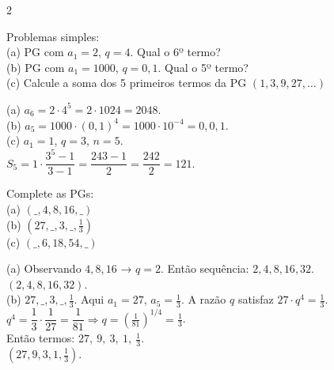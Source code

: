 \documentclass[11pt]{article}
\begin{document}
\begin{multicols}{2}
\begin{enumerate}[leftmargin=*]
\begin{tcolorbox}[colback=blue!8,colframe=blue!60!black,title=\textbf{Questão 7 },text width=0.85\columnwidth]
Problemas simples: \\
(a) PG com $a_1=2$, $q=4$. Qual o 6º termo? \\
(b) PG com $a_1=1000$, $q=0{,}1$. Qual o 5º termo? \\
(c) Calcule a soma dos 5 primeiros termos da PG $(1,3,9,27,\ldots)$
\end{tcolorbox}

\begin{tcolorbox}[colback=green!10,colframe=green!60!black,title=\textbf{Solução da questão 7 },text width=0.85\columnwidth]
(a) $a_6 = 2\cdot 4^{5} = 2\cdot 1024 = \boxed{2048}. $ \\

(b) $a_5 = 1000\cdot (0{,}1)^{4} = 1000\cdot 10^{-4} = 0{,} \boxed{0{,}1}.$ \\

(c) $a_1=1$, $q=3$, $n=5$. \\
    $S_5 = 1\cdot\dfrac{3^{5}-1}{3-1} = \dfrac{243-1}{2} = \dfrac{242}{2} = \boxed{121}.$
\end{tcolorbox}

\begin{tcolorbox}[colback=blue!8,colframe=blue!60!black,title=\textbf{Questão 8 },text width=0.85\columnwidth]
Complete as PGs: \\
(a) $(\_,4,8,16,\_)$ \\ (b) $(27,\_,3,\_,\tfrac{1}{3})$ \\ (c) $(\_,6,18,54,\_)$
\end{tcolorbox}

\begin{tcolorbox}[colback=green!10,colframe=green!60!black,title=\textbf{Solução da questão 8 },text width=0.9\columnwidth]
(a) Observando $4,8,16$ → $q=2$. Então sequência: $2,4,8,16,32$. \\
\(\boxed{(2,4,8,16,32)}\). \\

(b) $27,\_,3,\_,\tfrac{1}{3}$. Aqui $a_1=27$, $a_5=\tfrac{1}{3}$. A razão $q$ satisfaz $27\cdot q^{4}=\tfrac{1}{3}$. \\
$q^{4} = \dfrac{1}{3}\cdot\dfrac{1}{27} = \dfrac{1}{81} \Rightarrow q = \left(\tfrac{1}{81}\right)^{1/4} = \tfrac{1}{3}$. \\
Então termos: $27,\ 9,\ 3,\ 1,\ \tfrac{1}{3}$. \\
\(\boxed{(27,9,3,1,\tfrac{1}{3})}\). \\


\end{tcolorbox}
\end{enumerate}
\end{multicols}
\end{document}
